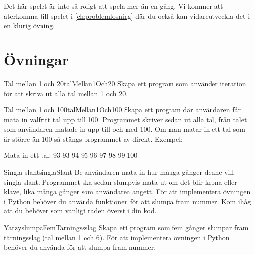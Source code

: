 Det här spelet är inte så roligt att spela mer än en gång. Vi kommer att återkomma till spelet i \autoref{ch:problemlosning} där du också kan vidareutveckla det i en klurig övning.

\newpage
\section{Övningar}

\begin{matteovning}{Tal mellan 1 och 20}{talMellan1Och20}
Skapa ett program som använder iteration för att skriva ut alla tal mellan 1 och 20.
\end{matteovning}

\begin{matteovning}{Tal mellan 1 och 100}{talMellan1Och100}
Skapa ett program där användaren får mata in valfritt tal upp till 100. Programmet skriver sedan ut alla tal, från talet som användaren matade in upp till och med 100. Om man matar in ett tal som är större än 100 så stängs programmet av direkt.
\newline
\newline
Exempel:
\vspace{10pt}
\begin{python}
Mata in ett tal: 93
93
94
95
96
97
98
99
100
\end{python}
\end{matteovning}

\begin{matteovning}{Singla slant}{singlaSlant}
Be användaren mata in hur många gånger denne vill singla slant. Programmet ska sedan slumpvis mata ut om det blir krona eller klave, lika många gånger som användaren angett.
\newline
\newline
För att implementera övningen i Python behöver du använda funktionen  för att slumpa fram nummer. Kom ihåg att du behöver som vanligt raden  överst i din kod.
\end{matteovning}

\newpage
\begin{matteovning}{Yatzy}{slumpaFemTarningssslag}
Skapa ett program som fem gånger slumpar fram tärningsslag (tal mellan 1 och 6).
\newline
\newline
För att implementera övningen i Python behöver du använda  för att slumpa fram nummer.
\end{matteovning}

